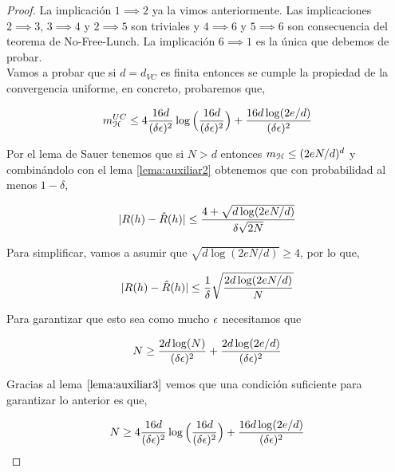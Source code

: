     \begin{proof}
    La implicación $1 \implies 2$ ya la vimos anteriormente. Las implicaciones $2\implies 3$, $3 \implies 4$ y $2 \implies 5$ son triviales y $4 \implies 6$ y $5 \implies 6$ son consecuencia del teorema de No-Free-Lunch. La implicación $6 \implies 1$ es la única que debemos de probar.\\
    
    Vamos a probar que si $d = d_{VC}$ es finita entonces se cumple la propiedad de la convergencia uniforme, en concreto, probaremos que,
    
    \begin{equation}
        m_{\mathcal{H}}^{UC} \leq 4\frac{16d}{(\delta \epsilon)^2} \log \Big( \frac{16d}{(\delta \epsilon)^2}\Big) + \frac{16d \log(2e/d)}{(\delta \epsilon)^2}
    \end{equation}
    
   \noindent Por el lema de Sauer tenemos que si $N > d$ entonces $m_{\mathcal{H}} \leq (2eN/d)^d$ y combinándolo con el lema \ref{lema:auxiliar2} obtenemos que con probabilidad al menos $1- \delta$,
   
   \begin{equation}
       |R(h) - \hat{R}(h)| \leq \frac{4 + \sqrt{d\log(2eN/d)}}{\delta \sqrt{2N}}
   \end{equation}
   
   \noindent Para simplificar, vamos a asumir que $\sqrt{d\log(2eN/d)} \geq 4$, por lo que,
   
   \begin{equation}
       |R(h) - \hat{R}(h)| \leq \frac{1}{\delta} \sqrt{\frac{2d\log(2eN/d)}{N}}
   \end{equation}
   
   \noindent Para garantizar que esto sea como mucho $\epsilon$ necesitamos que 
   
   \begin{equation}
       N \geq \frac{2d\log(N)}{(\delta \epsilon)^2} + \frac{2d \log(2e/d)}{(\delta \epsilon)^2}
   \end{equation}
   
   \noindent Gracias al lema $\ref{lema:auxiliar3}$ vemos que una condición suficiente para garantizar lo anterior es que,
   
   \begin{equation}
       N \geq 4\frac{16d}{(\delta \epsilon)^2} \log \Big( \frac{16d}{(\delta \epsilon)^2}\Big) + \frac{16d \log(2e/d)}{(\delta \epsilon)^2}
   \end{equation}
   
   
    \end{proof}
   

